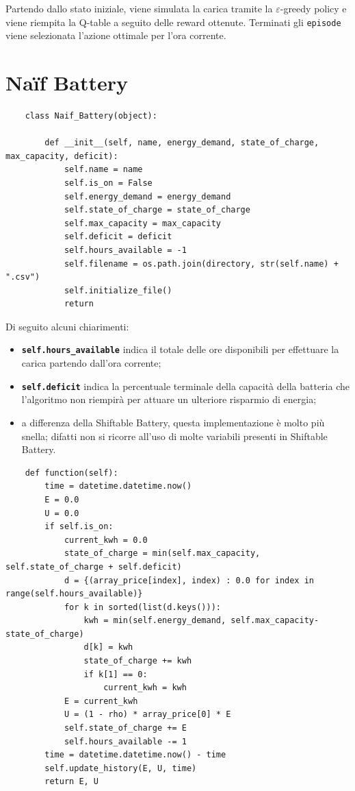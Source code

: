 \documentclass[italian, Lau, oneside]{sapthesis}
\begin{document}
Partendo dallo stato iniziale, viene simulata la carica tramite la $\varepsilon$-greedy policy e viene riempita la Q-table a seguito delle reward ottenute. Terminati gli \texttt{episode} viene selezionata l'azione ottimale per l'ora corrente.


\section{Naïf Battery}
\begin{verbatim}
    class Naif_Battery(object):
    
        def __init__(self, name, energy_demand, state_of_charge, max_capacity, deficit):
            self.name = name
            self.is_on = False
            self.energy_demand = energy_demand
            self.state_of_charge = state_of_charge
            self.max_capacity = max_capacity
            self.deficit = deficit
            self.hours_available = -1 
            self.filename = os.path.join(directory, str(self.name) + ".csv")
            self.initialize_file()
            return
\end{verbatim}

Di seguito alcuni chiarimenti: 
\begin{itemize}

    \item \textbf{\texttt{self.hours\_available}} indica il totale delle ore disponibili per effettuare la carica partendo dall'ora corrente;
    \item \textbf{\texttt{self.deficit}} indica la percentuale terminale della capacità della batteria che l'algoritmo non riempirà per attuare un ulteriore risparmio di energia;
    \item a differenza della Shiftable Battery, questa implementazione è molto più snella; difatti non si ricorre all'uso di molte variabili presenti in Shiftable Battery.
    
\end{itemize}

\begin{verbatim}
    def function(self):
        time = datetime.datetime.now()
        E = 0.0
        U = 0.0
        if self.is_on:
            current_kwh = 0.0
            state_of_charge = min(self.max_capacity, self.state_of_charge + self.deficit)
            d = {(array_price[index], index) : 0.0 for index in range(self.hours_available)}
            for k in sorted(list(d.keys())):
                kwh = min(self.energy_demand, self.max_capacity-state_of_charge)
                d[k] = kwh
                state_of_charge += kwh
                if k[1] == 0:
                    current_kwh = kwh
            E = current_kwh
            U = (1 - rho) * array_price[0] * E
            self.state_of_charge += E
            self.hours_available -= 1
        time = datetime.datetime.now() - time
        self.update_history(E, U, time)
        return E, U
\end{verbatim}
\end{document}
